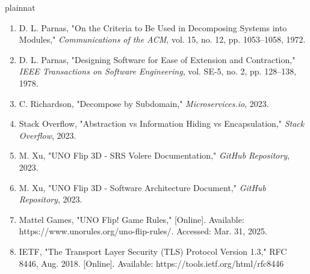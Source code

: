\documentclass[12pt, titlepage]{article}
\begin{document}
\newpage
 {plainnat}

\begin{enumerate}
    \item D. L. Parnas, "On the Criteria to Be Used in Decomposing Systems into Modules," \textit{Communications of the ACM}, vol. 15, no. 12, pp. 1053--1058, 1972.
    \item D. L. Parnas, "Designing Software for Ease of Extension and Contraction," \textit{IEEE Transactions on Software Engineering}, vol. SE-5, no. 2, pp. 128–138, 1978.
    \item C. Richardson, "Decompose by Subdomain," \textit{Microservices.io}, 2023.
    \item Stack Overflow, "Abstraction vs Information Hiding vs Encapsulation," \textit{Stack Overflow}, 2023.
    \item M. Xu, "UNO Flip 3D - SRS Volere Documentation," \textit{GitHub Repository}, 2023.
    \item M. Xu, "UNO Flip 3D - Software Architecture Document," \textit{GitHub Repository}, 2023.
    \item Mattel Games, "UNO Flip! Game Rules," [Online]. Available: https://www.unorules.org/uno-flip-rules/. Accessed: Mar. 31, 2025.
    \item IETF, "The Transport Layer Security (TLS) Protocol Version 1.3," RFC 8446, Aug. 2018. [Online]. Available: https://tools.ietf.org/html/rfc8446
\end{enumerate}
\end{document}
